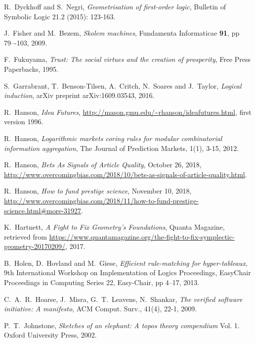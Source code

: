 \documentclass[english,letter paper,12pt,reqno]{article}
\theoremstyle{example}
\begin{document}
\begin{thebibliography}{BHLS03}
R.~Dyckhoff and S.~Negri, \textsl{Geometrisation of first-order logic}, Bulletin of Symbolic Logic 21.2 (2015): 123-163.

J.~Fisher and M.~Bezem, \textsl{Skolem machines}, Fundamenta Informaticae \textbf{91}, pp 79–-103, 2009.

F.~Fukuyama, \textsl{Trust: The social virtues and the creation of prosperity}, Free Press Paperbacks, 1995. 

S.~Garrabrant, T.~Benson-Tilsen, A.~Critch, N.~Soares and J.~Taylor, \textsl{Logical induction}, arXiv preprint arXiv:1609.03543, 2016. 

R.~Hanson, \textsl{Idea Futures}, \href{http://mason.gmu.edu/~rhanson/ideafutures.html}{http://mason.gmu.edu/{\textasciitilde}rhanson/ideafutures.html}, first version 1996.

R.~Hanson, \textsl{Logarithmic markets coring rules for modular combinatorial information aggregation}, The Journal of Prediction Markets, 1(1), 3-15, 2012.

R.~Hanson, \textsl{Bets As Signals of Article Quality}, October 26, 2018, \href{http://www.overcomingbias.com/2018/10/bets-as-signals-of-article-quality.html}{http://www.overcomingbias.com/2018/10/bets-as-signals-of-article-quality.html}.

R.~Hanson, \textsl{How to fund prestige science}, November 10, 2018, \href{http://www.overcomingbias.com/2018/11/how-to-fund-prestige-science.html\#more-31927}{http://www.overcomingbias.com/2018/11/how-to-fund-prestige-science.html\#more-31927}.

K.~Hartnett, \textsl{A Fight to Fix Geometry’s Foundations}, Quanta Magazine, retrieved from \href{https://www.quantamagazine.org/the-fight-to-fix-symplectic-geometry-20170209/}{https://www.quantamagazine.org/the-fight-to-fix-symplectic-geometry-20170209/}, 2017.

B.~Holen, D.~Hovland and M.~Giese, \textsl{Efficient rule-matching for hyper-tableaux}, 9th International Workshop on Implementation of Logics Proceedings, EasyChair Proceedings in Computing Series 22, Easy-Chair, pp 4–17, 2013.

C.~A.~R.~Hoarse, J.~Misra, G.~T.~Leavens, N.~Shankar, \textsl{The verified software initiative: A manifesto}, ACM Comput. Surv., 41(4), 22-1, 2009.

P.~T.~Johnstone, \textsl{Sketches of an elephant: A topos theory compendium} Vol. 1. Oxford University Press, 2002.


\end{thebibliography}
\end{document}
